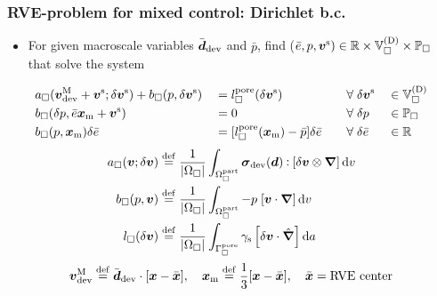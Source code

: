 \documentclass[11pt]{beamer} %
\newcommand{\pore}{\mathrm{pore}}
\newcommand{\particle}{\mathrm{part}}
\newcommand{\surf}{\mathrm{s}}
\renewcommand{\alert}[1]{\textbf{#1}}
\begin{document}
\begin{frame}
\frametitle{RVE-problem for mixed control: Dirichlet b.c.}
 \begin{itemize}
  \item For given macroscale variables $\bar{\boldsymbol{d}}_{\mathrm{dev}}$ and $\bar p$, find ($\bar{e},p,\boldsymbol{v}^{\mathrm{s}})\in\mathbb{R}\times\mathbb{V}_\Box^{(\mathrm{D})}\times\mathbb{P}_\Box$ that solve the system
 \end{itemize}
\vspace{-2truemm}
\begin{alignat*}{4}
    & a_\Box(\ta{v}^\macro_\dev + \ta{v}^\fluct;\delta \ta{v}^\fluct) +  b_\Box(p,\delta\ta{v}^\fluct)
    && =
    l^\pore_\Box(\delta \ta{v}^\fluct)
    &\quad& \forall\; \delta \ta{v}^\fluct &&\in \set{V}_\Box^{(\Dirichlet)}
 \\
    &b_\Box(\delta p, \bar{e} \ta x_\mean +\ta{v}^\fluct)
    && =
    0
    && \forall\; \delta p &&\in \set{P}_\Box
\\
    &b_\Box(p,\ta{x}_\mean)\delta\bar{e}
    && =
    [l_\Box^\pore(\ta{x}_\mean) - \bar{p}]\delta\bar{e}
    && \forall\; \delta\bar{e} &&\in \set{R}
\end{alignat*}
\vspace{-5truemm}
\begin{align*}
    a_\Box(\ta{v};\delta \ta{v})
    & \defeq
    \frac{1}{|\Omega_\Box|}\int_{\Omega^\particle_\Box} \ta{\sigma}_\dev(\ta{d}) \dprod \left[\delta \ta{v} \outerp \diff\right] \dif v
\\
    b_\Box(p, \ta{v})
    & \defeq
    \frac{1}{|\Omega_\Box|}\int_{\Omega^\particle_\Box} -p\;[\ta{v}\cdot \diff] \dif v
\\
    l_\Box(\delta \ta{v})
    & \defeq
    \frac{1}{|\Omega_{\Box}|} \int_{\Gamma_{\Box}^\pore}
  \gamma_\surf\left[\delta\ta{v}\cdot\hat{\ta\nabla}\right] \dif a
\end{align*}
\begin{gather*}
 \boldsymbol{v}_{\mathrm{dev}}^{\mathrm{M}} \overset{\mathrm{def}}{=} \bar{\boldsymbol{d}}_{\mathrm{dev}} \cdot[\boldsymbol{x} - \bar{\boldsymbol{x}}],\quad \boldsymbol{x}_{\mathrm{m}} \overset{\mathrm{def}}{=} \frac13[\boldsymbol{x}-\bar{\boldsymbol{x}}], \quad \bar{\boldsymbol{x}} = \text{RVE center}
\end{gather*}
\end{frame}
\end{document}
